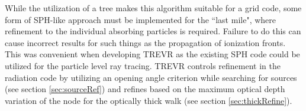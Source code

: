 While the utilization of a tree makes this algorithm suitable for a grid code, some form of SPH-like approach must be implemented for the ``last mile", where refinement to the individual absorbing particles is required. Failure to do this can cause incorrect results for such things as the propagation of ionization fronts. This was convenient when developing TREVR as the existing SPH code could be utilized for the particle level ray tracing. TREVR controls refinement in the radiation code by utilizing an opening angle criterion while searching for sources (see section \ref{sec:sourceRef}) and refines based on the maximum optical depth variation of the node for the optically thick walk (see section \ref{sec:thickRefine}). 
